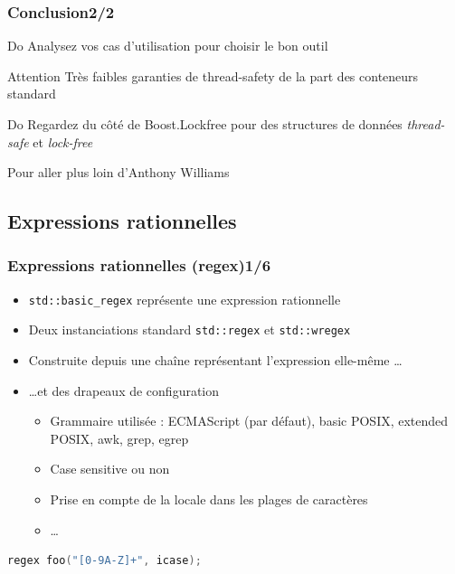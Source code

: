 \documentclass[C++.tex]{subfiles}
\begin{document}
\begin{frame}[fragile]
	\frametitle{Conclusion\titlehfill{}2/2}
	\begin{exampleblock}{Do}
		Analysez vos cas d'utilisation pour choisir le bon outil
	\end{exampleblock}

	\begin{alertblock}{Attention}
		Très faibles garanties de thread-safety de la part des conteneurs standard

	\end{alertblock}

	\begin{exampleblock}{Do}
		Regardez du côté de Boost.Lockfree pour des structures de données \textit{thread-safe} et \textit{lock-free}
	\end{exampleblock}

	\begin{block}{Pour aller plus loin}
		\cite{ConcInAction} d'Anthony Williams

	\end{block}
\end{frame}

\subsection*{Expressions rationnelles}
\begin{frame}[fragile]
	\frametitle{Expressions rationnelles (regex)\titlehfill{}1/6}
	\begin{itemize}
		\item \lstinline|std::basic_regex| représente une expression rationnelle
		\item Deux instanciations standard \lstinline|std::regex| et \lstinline|std::wregex|
		\item Construite depuis une chaîne représentant l'expression elle-même \ldots
		\item \ldots{}et des drapeaux de configuration
		\begin{itemize}
			\item Grammaire utilisée : ECMAScript (par défaut), basic POSIX, extended POSIX, awk, grep, egrep
			\item Case sensitive ou non
			\item Prise en compte de la locale dans les plages de caractères
			\item \ldots
		\end{itemize}
	\end{itemize}

	\begin{lstlisting}[language=C++]
regex foo("[0-9A-Z]+", icase);\end{lstlisting}
\end{frame}
\end{document}
